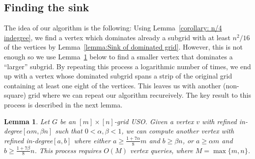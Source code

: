 \documentclass[a4paper,10pt]{article}
\newtheorem{lemma}{Lemma}
\newcommand{\indegree}{refined in-degree\xspace}
\begin{document}
\subsection{Finding the sink}
The idea of our algorithm is the following: Using Lemma~\ref{corollary: n/4 indegree}, we find a vertex which dominates already a subgrid with at least $n^2/16$ of the vertices  by Lemma~\ref{lemma:Sink of dominated grid}. However, this is not enough so we use Lemma~\ref{lemma:Constant fraction improvement} below to find a smaller vertex that dominates a ``larger'' subgrid. By repeating this process a logarithmic number of times, we end up with a vertex whose dominated subgrid spans a strip of the original grid containing at least one eight of the vertices. This leaves us with another (non-square) grid where we can repeat our algorithm recureively. The key result to this process is described in the next lemma.


\begin{lemma}\label{lemma:Constant fraction improvement}
Let $G$ be an $[m]\times[n]$-grid USO. 
Given a vertex $v$ with \indegree $[\alpha m, \beta n]$ such that $0 < \alpha, \beta < 1$, we can compute another vertex with \indegree $[a,b]$ where either $a\geq \frac{1+7\alpha}{8}m$ and $b \geq \beta n$, or $a \geq \alpha m$ and $b \geq \frac{1 + 7\beta}{8}n$. This process requires $O(M)$ vertex queries, where $M = \max\{m,n\}$.
\end{lemma}
\end{document}
